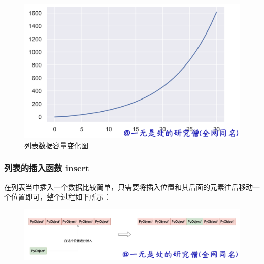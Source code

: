     \begin{figure}[h]
        \centering
            \includegraphics[scale=.2]{images/03-list.png}
            \caption{列表数据容量变化图}
        \label{fig:my_label}
    \end{figure}
    
\subsubsection{列表的插入函数 insert}
在列表当中插入一个数据比较简单，只需要将插入位置和其后面的元素往后移动一个位置即可，整个过程如下所示：

    \begin{figure}[h]
        \centering
            \includegraphics[scale=.3]{images/04-list.png}
            \caption{ }
        \label{fig:my_label}
    \end{figure}
    

